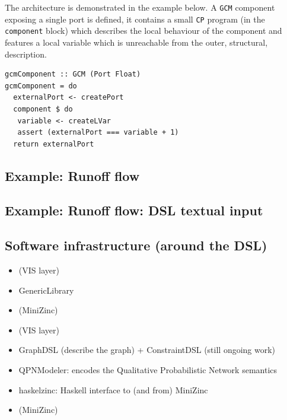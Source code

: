 \documentclass[]{article}
\begin{document}
 The architecture is demonstrated
in the example below. A \texttt{GCM} component exposing a single port is
defined, it contains a small \texttt{CP} program (in the
\texttt{component} block) which describes the local behaviour of the
component and features a local variable which is unreachable from the
outer, structural, description.

\begin{verbatim}
gcmComponent :: GCM (Port Float)
gcmComponent = do
  externalPort <- createPort
  component $ do
   variable <- createLVar
   assert (externalPort === variable + 1)
  return externalPort
\end{verbatim}

\subsection{Example: Runoff flow}\label{example-runoff-flow}


\subsection{Example: Runoff flow: DSL textual
input}\label{example-runoff-flow-dsl-textual-input}


\subsection{Software infrastructure (around the
DSL)}\label{software-infrastructure-around-the-dsl}



\begin{itemize}
\item
  (VIS layer)
\item
  GenericLibrary
\item
  (MiniZinc)
\item
  (VIS layer)
\item
  GraphDSL (describe the graph) + ConstraintDSL (still ongoing work)
\item
  QPNModeler: encodes the Qualitative Probabilistic Network semantics
\item
  haskelzinc: Haskell interface to (and from) MiniZinc
\item
  (MiniZinc)
\end{itemize}
\end{document}
